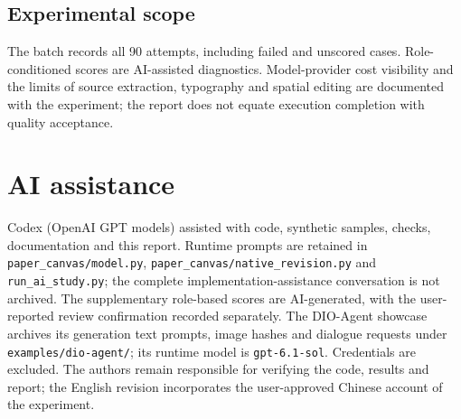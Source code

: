 \documentclass{article}
\begin{document}
\subsection{Experimental scope}
The batch records all 90 attempts, including failed and unscored cases. Role-conditioned scores are AI-assisted diagnostics. Model-provider cost visibility and the limits of source extraction, typography and spatial editing are documented with the experiment; the report does not equate execution completion with quality acceptance.

\section{AI assistance}

Codex (OpenAI GPT models) assisted with code, synthetic samples, checks, documentation and this report. Runtime prompts are retained in \texttt{paper\_canvas/model.py}, \texttt{paper\_canvas/native\_revision.py} and \texttt{run\_ai\_study.py}; the complete implementation-assistance conversation is not archived. The supplementary role-based scores are AI-generated, with the user-reported review confirmation recorded separately. The DIO-Agent showcase archives its generation text prompts, image hashes and dialogue requests under \texttt{examples/dio-agent/}; its runtime model is \texttt{gpt-6.1-sol}. Credentials are excluded. The authors remain responsible for verifying the code, results and report; the English revision incorporates the user-approved Chinese account of the experiment.

\end{document}
